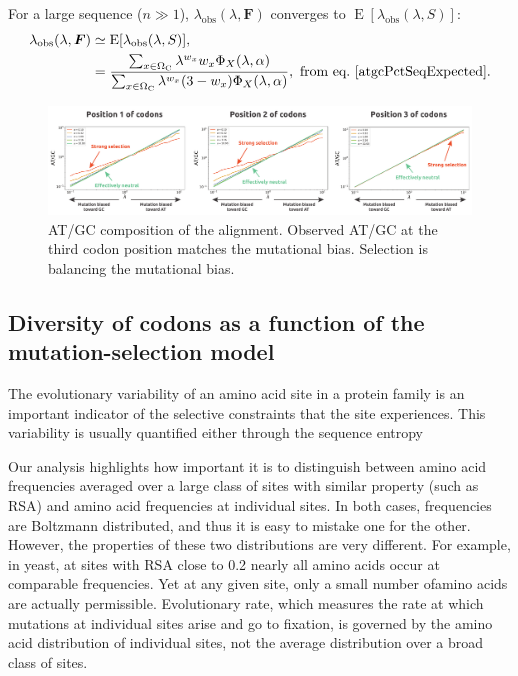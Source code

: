 For a large sequence ($ n \gg 1 $), $\lambda_{\mathrm{obs}} (\lambda, \bm{F})$ converges to $\operatorname{E} [\lambda_{\mathrm{obs}}(\lambda, S)]$:
\begin{align}
\lambda_{\mathrm{obs}} (\lambda, \bm{F})
& \simeq \operatorname{E} [\lambda_{\mathrm{obs}}(\lambda, S)],\\
& =\frac{\sum_{x \in \Omega_{\mathrm{C}}} \lambda^{w_x} w_x \Phi_X(\lambda, \alpha)}{\sum_{x \in \Omega_{\mathrm{C}}} \lambda^{w_x} (3 - w_x) \Phi_X(\lambda, \alpha)}, \ \textrm{from eq.} \ \ref{atgcPctSeqExpected}.
\end{align}

\begin{figure}[thbp]
	\begin{center}
		\includegraphics[width=\textwidth] {figures/mut-bias-AT-GC-obs}
	\end{center}
	\caption[AT/GC composition of the alignment]{AT/GC composition of the alignment. Observed AT/GC at the third codon position matches the mutational bias. Selection is balancing the mutational bias.}
\end{figure}

\subsection{Diversity of codons as a function of the mutation-selection model}

The evolutionary variability of an amino acid site in a protein family is an important indicator of the selective constraints that the site experiences. This variability is usually quantified either through the sequence entropy \citep{Goldstein2017}

Our analysis highlights how important it is to distinguish between amino acid frequencies averaged over a large class of sites with similar property (such as RSA) and amino acid frequencies at individual sites. In both cases, frequencies are Boltzmann distributed, and thus it is easy to mistake one for the other. However, the properties of these two distributions are very different. For example, in yeast, at sites with RSA close to 0.2 nearly all amino acids occur at comparable frequencies. Yet at any given site, only a small number ofamino acids are actually permissible. Evolutionary rate, which measures the rate at which mutations at individual sites arise and go to fixation, is governed by the amino acid distribution of individual sites, not the average distribution over a broad class of sites. \citep{Ramsey2011}

